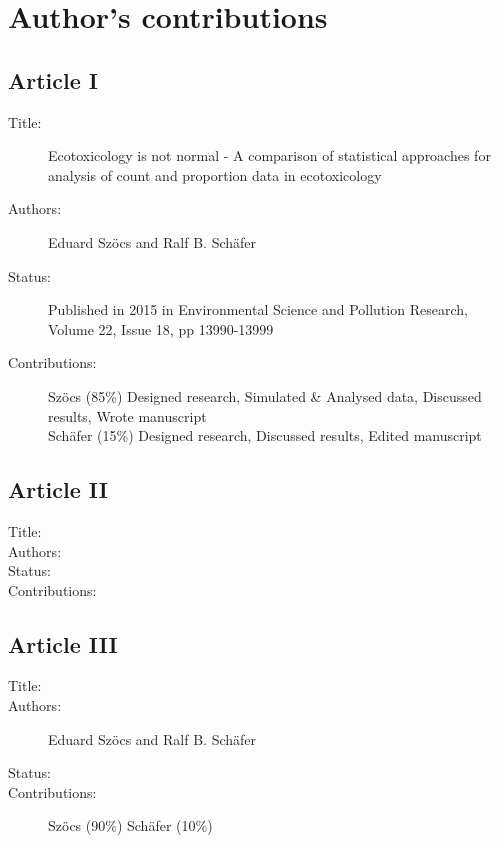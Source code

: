 \chapter{Author's contributions}

\section*{Article I}
\small
\begin{description}
	\item[Title:] Ecotoxicology is not normal - A comparison of statistical approaches for analysis of count and proportion data in ecotoxicology
	\item[Authors:] Eduard Szöcs and Ralf B. Schäfer
	\item[Status:] Published in 2015 in Environmental Science and Pollution Research, Volume 22, Issue 18, pp 13990-13999
	\item[Contributions:] Szöcs (85\%) Designed research, Simulated \& Analysed data, Discussed results, Wrote manuscript \\
	Schäfer (15\%) Designed research, Discussed results, Edited manuscript
\end{description}
\normalsize


\section*{Article II}
\small
\begin{description}
	\item[Title:] 
	\item[Authors:] 
	\item[Status:] 
	\item[Contributions:] 
\end{description}
\normalsize


\section*{Article III}
\small
\begin{description}
	\item[Title:] 
	\item[Authors:] Eduard Szöcs and Ralf B. Schäfer
	\item[Status:] 
	\item[Contributions:] Szöcs (90\%) 
	Schäfer (10\%) 
\end{description}
\normalsize


